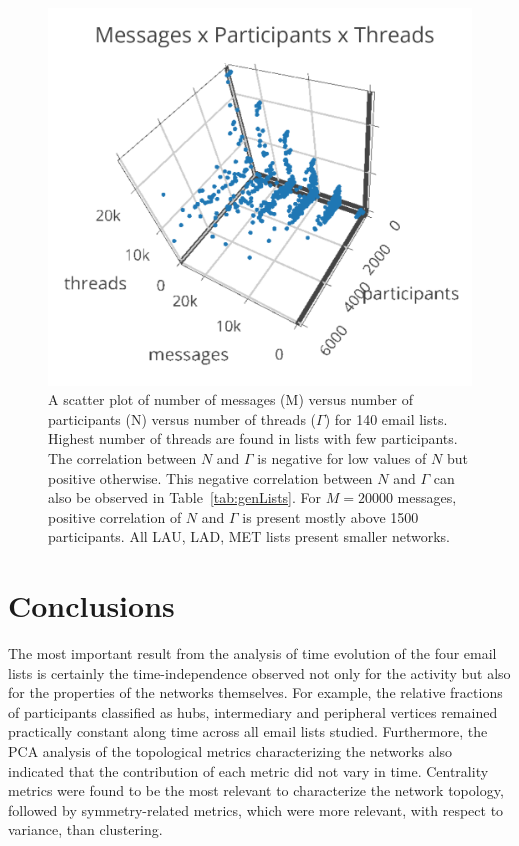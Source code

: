 \documentclass[%
	aip,
	jmp,%
	amsmath,amssymb,
	reprint,%
]{revtex4-1}
\begin{document}
\begin{figure}
   \centering
        \includegraphics[width=\columnwidth]{figs/mpgamma____________}
	\caption{A scatter plot of number of messages (M) versus number of participants (N) versus number of threads ($\Gamma$) for 140 email lists. Highest number of threads are found in lists with few participants. The correlation between $N$ and $\Gamma$ is negative for low values of $N$ but positive otherwise. This negative correlation between $N$ and $\Gamma$ can also be observed in Table~\ref{tab:genLists}. For $M=20000$ messages, positive correlation of $N$ and $\Gamma$ is present mostly above 1500 participants. All LAU, LAD, MET lists present smaller networks.}
	\label{fig:nmgamma3d}
\end{figure}



\section{Conclusions}\label{sec:conc}
The most important result from the analysis of time evolution of the four email lists is certainly the time-independence observed not only for the activity but also for the properties of the networks themselves.
For example, the relative fractions of participants classified as hubs, intermediary and peripheral vertices remained practically constant along time across all email lists studied.
Furthermore, the PCA analysis of the topological metrics characterizing the networks also indicated that the contribution of each metric did not vary in time.
Centrality metrics were found to be the most relevant to characterize the network topology, followed by symmetry-related metrics, which were more relevant, with respect to variance, than clustering. 
\end{document}
